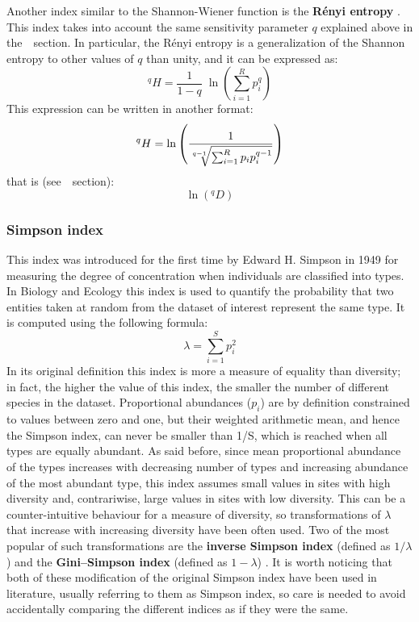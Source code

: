 Another index similar to the Shannon-Wiener function is the \textbf{R\'{e}nyi entropy} \cite{alfred1960measures}. This index takes into account the same sensitivity parameter $q$ explained above in the~~section. In particular, the R\'{e}nyi entropy is a generalization of the Shannon entropy to other values of $q$ than unity, and it can be expressed as:
\begin{equation*}
{}^qH = \frac{1}{1-q} \; \ln\left ( \sum_{i=1}^R p_i^q \right )
\end{equation*}
This expression can be written in another format:
\begin{equation*}
{}^qH = \ln\left ( {1 \over \sqrt[q-1]{{\sum_{i=1}^R p_i p_i^{q-1}}}} \right )
\end{equation*}
that is (see~~section): 
\begin{equation*}
\ln({}^q\!D)
\end{equation*}

\subsubsection*{Simpson index}
This index was introduced for the first time by Edward H. Simpson in 1949 \cite{simpson1949measurement} for measuring the degree of concentration when individuals are classified into types. In Biology and Ecology this index is used to quantify the probability that two entities taken at random from the dataset of interest represent the same type. It is computed using the following formula: 
\begin{equation*}
\lambda = \sum_{i=1}^S p_i^2
\end{equation*}
In its original definition this index is more a measure of equality than diversity; in fact, the higher the value of this index, the smaller the number of different species in the dataset. Proportional abundances ($p_i$) are by definition constrained to values between zero and one, but their weighted arithmetic mean, and hence the Simpson index, can never be smaller than 1/S, which is reached when all types are equally abundant. As said before, since mean proportional abundance of the types increases with decreasing number of types and increasing abundance of the most abundant type, this index assumes small values in sites with high diversity and,
contrariwise, large values in sites with low diversity. This can be a counter-intuitive behaviour for a measure of diversity, so transformations of $\lambda$ that increase with increasing diversity have been often used. Two of the most popular of such transformations are the \textbf{inverse Simpson index} (defined as $1/\lambda$) and the \textbf{Gini–Simpson index} (defined as $1 - \lambda$) \cite{hill1973diversity,jost2006entropy}. It is worth noticing that both of these modification of the original Simpson index have been used in literature, usually referring to them as Simpson index, so care is needed to avoid accidentally comparing the different indices as if they were the same.\\

